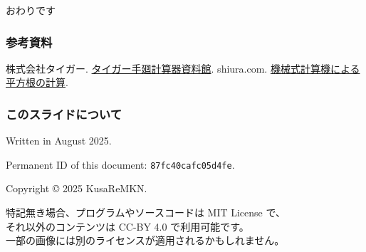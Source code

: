 \documentclass[
  lualatex,
  aspectratio=169,
  fleqn,
  14pt
]{beamer}
\begin{document}
\appendix

\begin{frame}[standout]
  おわりです

\end{frame}

\begin{frame}
  \frametitle{参考資料}

  \beamertemplatetextbibitems
  \begin{thebibliography}{9}
      株式会社タイガー.
      \newblock
      \href{https://www.tiger-inc.co.jp/temawashi/temawashi.html}
        {タイガー手廻計算器資料館}.
      shiura.com.
      \newblock
      \href{https://shiura.com/unplugged/root/index.html}
        {機械式計算機による平方根の計算}.
  \end{thebibliography}
\end{frame}

\begin{frame}
  \frametitle{このスライドについて}

  Written in August 2025.

  Permanent ID of this document: \texttt{87fc40cafc05d4fe}.

  Copyright © 2025 KusaReMKN.

  特記無き場合、プログラムやソースコードは MIT License で、\\
  \hspace{1.5\zw}それ以外のコンテンツは CC-BY 4.0 で利用可能です。\\
  \hspace{1.5\zw}一部の画像には別のライセンスが適用されるかもしれません。
\end{frame}
\end{document}
